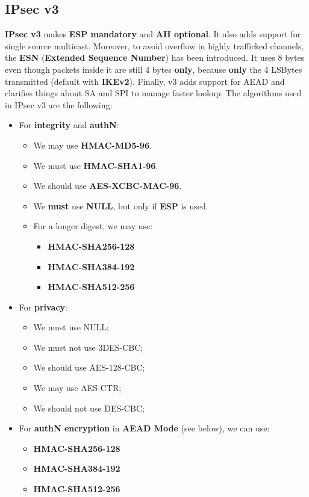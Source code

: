 \subsection{IPsec v3}
\textbf{IPsec v3} makes \textbf{ESP mandatory} and \textbf{AH optional}. It also adds support for single source
multicast. Moreover, to avoid overflow in highly trafficked channels, the \textbf{ESN} (\textbf{Extended Sequence Number}) has been introduced. It uses 8 bytes even though packets inside it are
still 4 bytes \textbf{only}, because \textbf{only} the 4 LSBytes transmitted (default with \textbf{IKEv2}). Finally, v3 adds support for AEAD and clarifies things about SA and SPI to manage faster lookup. The algorithms used in IPsec v3 are the following:
\begin{itemize}
    \item For \textbf{integrity} and \textbf{authN}:
    \begin{itemize}
        \item We may use \textbf{HMAC-MD5-96}.
        \item We must use \textbf{HMAC-SHA1-96}.
        \item We should use \textbf{AES-XCBC-MAC-96}.
        \item We \textbf{must} use \textbf{NULL}, but only if \textbf{ESP} is used.
        \item For a longer digest, we may use:
        \begin{itemize}
            \item \textbf{HMAC-SHA256-128}
            \item \textbf{HMAC-SHA384-192}
            \item \textbf{HMAC-SHA512-256}
        \end{itemize}
    \end{itemize}
    \item For \textbf{privacy}:
    \begin{itemize}
        \item We must use NULL;
        \item We must not use 3DES-CBC;
        \item We should use AES-128-CBC;
        \item We may use AES-CTR;
        \item We should not use DES-CBC;
    \end{itemize}
    \item For \textbf{authN encryption} in \textbf{AEAD Mode} (see below), we can use:
    \begin{itemize}
        \item \textbf{HMAC-SHA256-128}
        \item \textbf{HMAC-SHA384-192}
        \item \textbf{HMAC-SHA512-256}
    \end{itemize}
\end{itemize}
